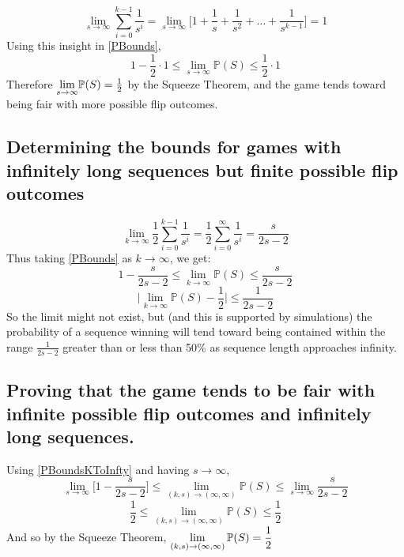 \documentclass[english,12pt,a4paper,final]{article}
\begin{document}
\begin{equation*}
	\lim_{s \rightarrow \infty}\sum_{i=0}^{k-1}\frac{1}{s^i} = \lim_{s \rightarrow \infty} \big[1 + \frac{1}{s} + \frac{1}{s^2} + \dots + \frac{1}{s^{k-1}}\big] = 1
\end{equation*}
Using this insight in \eqref{PBounds},
\begin{equation*}
	1-\frac{1}{2}\cdot1 \le \lim_{s\rightarrow\infty}\mathbb{P}(S) \le \frac{1}{2}\cdot1
\end{equation*}
Therefore $\mathlarger{\lim_{s\rightarrow\infty}}\mathbb{P}(S) = \frac{1}{2}$ by the Squeeze Theorem, and the game tends toward being fair with more possible flip outcomes.

\subsection{Determining the bounds for games with infinitely long sequences but finite possible flip outcomes}
\begin{equation*}
	\lim_{k\rightarrow\infty}\frac{1}{2}\sum_{i=0}^{k-1}\frac{1}{s^i} = \frac{1}{2}\sum_{i=0}^{\infty}\frac{1}{s^i} = \frac{s}{2s-2}
\end{equation*}
Thus taking \eqref{PBounds} as $k\rightarrow\infty$, we get:
\begin{equation}\label{PBoundsKToInfty}
	1-\frac{s}{2s-2} \le \lim_{k\rightarrow\infty} \mathbb{P}(S) \le \frac{s}{2s-2} 
\end{equation}
\begin{equation*}
	\big|\lim_{k\rightarrow\infty}\mathbb{P}(S) - \frac{1}{2}\big| \le \frac{1}{2s-2}
\end{equation*}
So the limit might not exist, but (and this is supported by simulations) the probability of a sequence winning will tend toward being contained within the range $\frac{1}{2s-2}$ greater than or less than 50\% as sequence length approaches infinity.

\subsection{Proving that the game tends to be fair with infinite possible flip outcomes and infinitely long sequences.}
Using \eqref{PBoundsKToInfty} and having $s\rightarrow\infty$,
\begin{equation*}
	\lim_{s\rightarrow\infty}\big[1-\frac{s}{2s-2}\big] \le \lim_{(k, s)\rightarrow(\infty, \infty)} \mathbb{P}(S) \le \lim_{s\rightarrow\infty}\frac{s}{2s-2} 
\end{equation*}
\begin{equation*}
	\frac{1}{2} \le \lim_{(k, s)\rightarrow(\infty, \infty)} \mathbb{P}(S) \le \frac{1}{2}
\end{equation*}
And so by the Squeeze Theorem, $\mathlarger{\lim_{(k, s)\rightarrow(\infty, \infty)} \mathbb{P}(S) = \frac{1}{2}}$
\end{document}
